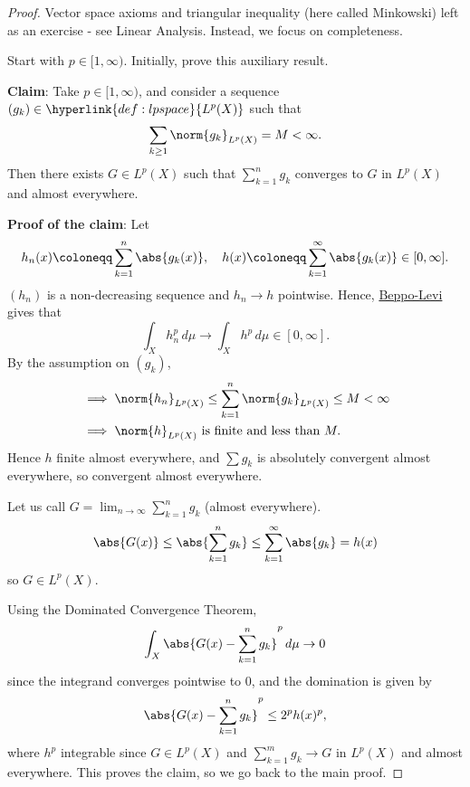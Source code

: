 \documentclass[twoside]{article}
\begin{document}
\begin{proof}
    Vector space axioms and triangular inequality (here called Minkowski) left as an exercise - see Linear Analysis.
    Instead, we focus on completeness.

    Start with $p \in [1, \infty)$.
    Initially, prove this auxiliary result.

    \textbf{Claim}: Take $p \in [1, \infty)$, and consider a sequence $(g_k) \in \hyperlink{def:lpspace}{L^p(X)}$ such that
    \begin{equation*}\sum_{k \geq 1} \norm{g_k}_{L^p(X)} = M < \infty.\end{equation*}
    Then there exists $G \in L^p(X)$ such that $\sum_{k=1}^n g_k$ converges to $G$ in $L^p(X)$ and almost everywhere.

    \textbf{Proof of the claim}: Let
    \begin{equation*}
        h_n(x) \coloneqq \sum_{k=1}^n \abs{g_k(x)}, \quad h(x) \coloneqq \sum_{k=1}^\infty \abs{g_k(x)} \in [0, \infty].
    \end{equation*}
    $(h_n)$ is a non-decreasing sequence and $h_n \to h$ pointwise.
    Hence, \hyperlink{thm:Beppo}{Beppo-Levi} gives that
    \begin{equation*}
        \int_X h_n^p \, d\mu \to \int_X h^p  \, d\mu \in [0, \infty].
    \end{equation*}
    By the assumption on $(g_k)$,
    \begin{align*}
        &\implies \norm{h_n}_{L^p(X)} \leq \sum_{k=1}^n \norm{g_k}_{L^p(X)} \leq M < \infty \\
        &\implies \norm{h}_{L^p(X)} \text{ is finite and less than } M.
    \end{align*}
    Hence $h$ finite almost everywhere, and $\sum g_k$ is absolutely convergent almost everywhere, so convergent almost everywhere.

    Let us call $G = \lim_{n \to \infty} \sum_{k=1}^n g_k$ (almost everywhere).
    \begin{equation*}
        \abs{G(x)} \leq \abs{\sum_{k=1}^n g_k} \leq \sum_{k=1}^\infty \abs{g_k} = h(x)
    \end{equation*}
    so $G \in L^p(X)$.

    Using the Dominated Convergence Theorem,
    \begin{equation*}
        \int_X \abs{G(x) - \sum_{k=1}^n g_k}^p \, d\mu \to 0
    \end{equation*}
    since the integrand converges pointwise to 0, and the domination is given by
    \begin{equation*}\abs{G(x) - \sum_{k=1}^n g_k}^p \leq 2^p h(x)^p,\end{equation*} where $h^p$ integrable since $G \in L^p(X)$ and $\sum_{k=1}^m g_k \to G$ in $L^p(X)$ and almost everywhere.
    This proves the claim, so we go back to the main proof.


\end{proof}
\end{document}
